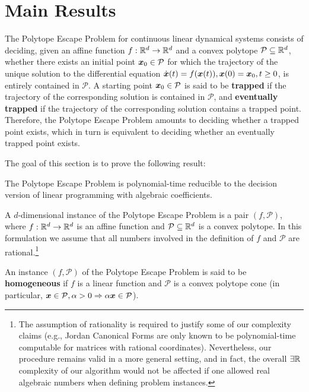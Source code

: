 \section{Main Results}

The Polytope Escape Problem for continuous linear dynamical systems
consists of deciding, given an affine function
$f:\mathbb{R}^{d}\rightarrow \mathbb{R}^{d}$ and a convex polytope
$\mathcal{P}\subseteq\mathbb{R}^{d}$, whether there exists an initial point
$\boldsymbol{x}_{0} \in \mathcal{P}$ for which the trajectory of the unique
solution to the differential equation
$\dot{\boldsymbol{x}}(t)=f(\boldsymbol{x}(t)),\boldsymbol{x}(0)=\boldsymbol{x}_{0},
t\geq 0$,
is entirely contained in $\mathcal{P}$.  A starting point
$\boldsymbol{x}_{0}\in\mathcal{P}$ is said to be \textbf{trapped} if
the trajectory of the corresponding solution is contained in $\mathcal{P}$,
and \textbf{eventually trapped} if the trajectory of the corresponding
solution contains a trapped point. Therefore, the Polytope Escape
Problem amounts to deciding whether a trapped point exists, which in
turn is equivalent to deciding whether an eventually trapped point exists.

The goal of this section is to prove the following result:

\begin{theorem}
  The Polytope Escape Problem is polynomial-time reducible to the
  decision version of linear programming with algebraic coefficients.
\end{theorem}

A $d$-dimensional instance of the Polytope Escape Problem is a pair
$(f,\mathcal{P})$, where $f:\mathbb{R}^{d}\rightarrow \mathbb{R}^{d}$
is an affine function and $\mathcal{P}\subseteq\mathbb{R}^{d}$ is a
convex polytope. In this formulation we assume that all numbers
involved in the definition of $f$ and $\mathcal{P}$ are
rational.\footnote{The assumption of rationality is required to
  justify some of our complexity claims (e.g., Jordan Canonical Forms
  are only known to be polynomial-time computable for matrices with
  rational coordinates). Nevertheless, our procedure remains valid in
  a more general setting, and in fact, the overall
  $\exists \mathbb{R}$ complexity of our algorithm would not be
  affected if one allowed real algebraic numbers when defining problem
  instances.}

An instance $(f,\mathcal{P})$ of the Polytope Escape Problem is said
to be \textbf{homogeneous} if $f$ is a linear function and
$\mathcal{P}$ is a convex polytope cone (in particular,
$\boldsymbol{x}\in\mathcal{P},\alpha>0\Rightarrow \alpha\boldsymbol{x}
\in\mathcal{P}$).

